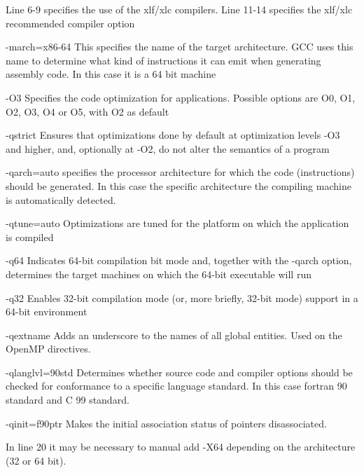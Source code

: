 Line 6-9 specifies the use of the xlf/xlc compilers. 
Line 11-14 specifies the xlf/xlc recommended compiler option  
\begin{description}
\item{-march=x86-64} This specifies the name of the target architecture. GCC uses this name to determine what kind of instructions it can emit when generating assembly code. In this case it is a 64 bit machine
\item{-O3} Specifies the code optimization for applications. Possible options are O0, O1, O2, O3, O4 or O5, with O2 as default
\item{-qstrict} Ensures that optimizations done by default at optimization levels -O3 and higher, and, optionally at -O2, do not alter the semantics of a program
\item{-qarch=auto} specifies the processor architecture for which the code (instructions) should be generated. In this case the specific architecture the compiling machine is automatically detected.
\item{-qtune=auto} Optimizations are tuned for the platform on which the application is compiled
\item{-q64} Indicates 64-bit compilation bit mode and, together with the -qarch option, determines the target machines on which the 64-bit executable will run
\item{-q32} Enables 32-bit compilation mode (or, more briefly, 32-bit mode) support in a 64-bit environment
\item{-qextname} Adds an underscore to the names of all global entities.
Used on the OpenMP directives. 
\item{-qlanglvl=90std} Determines whether source code and compiler options should be checked for conformance to a specific language standard. In this case fortran 90 standard and C 99 standard. 
\item{-qinit=f90ptr} Makes the initial association status of pointers disassociated.
  \end{description}
In line 20 it may be necessary to manual add -X64 depending on the architecture (32 or 64 bit). 

